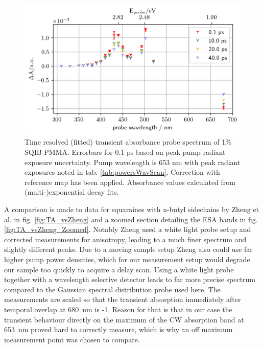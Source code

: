 \documentclass[twoside,openright]{scrreprt}
\begin{document}
\begin{figure}[hbt]
\centering
\includegraphics[scale=1]{images/TimeResolvedWavelengthScanSQIB1perc_PMMA_mapCorrected.png}
\caption{Time resolved (fitted) transient absorbance probe spectrum of 1\% SQIB PMMA. Errorbars for 0.1 ps based on peak pump radiant exposure uncertainty. Pump wavelength is 653 nm with peak radiant exposures noted in tab. \ref{tab:powersWavScan}. Correction with reference map has been applied. Absorbance values calculated from (multi-)exponential decay fits.\label{fig:SQIB_PMMAwavelengthscan}}
\end{figure}

A comparison is made to data for squaraines with n-butyl sidechains by Zheng et al.\cite{Zheng2020} in fig. \ref{fig:TA_vsZheng} and a zoomed section detailing the ESA bands in fig. \ref{fig:TA_vsZheng_Zoomed}. Notably Zheng\cite{Zheng2020} used a white light probe setup and corrected measurements for anisotropy, leading to a much finer spectrum and slightly different peaks. Due to a moving sample setup Zheng also could use far higher pump power densities, which for our measurement setup would degrade our sample too quickly to acquire a delay scan. Using a white light probe together with a wavelength selective detector leads to far more precise spectrum compared to the Gaussian spectral distribution probe used here. The measurements are scaled so that the transient absorption immediately after temporal overlap at \SI{680}{\nano\meter} is -1. Reason for that is that in our case the transient behaviour directly on the maximum of the CW absorption band at \SI{653}{\nano\meter} proved hard to correctly measure, which is why an off maximum measurement point was chosen to compare.%
\end{document}
